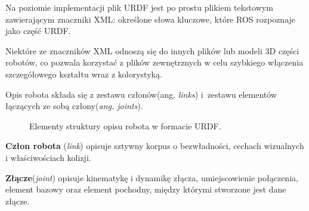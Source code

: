 Na poziomie implementacji plik URDF jest po prostu plikiem tekstowym
zawierającym znaczniki XML: określone słowa kluczowe, które ROS rozpoznaje jako
część URDF.

Niektóre ze znaczników XML odnoszą się do innych plików lub modeli 3D części
robotów, co pozwala korzystać z plików zewnętrznych w celu szybkiego włączenia
szczegółowego kształtu wraz z kolorystyką.

Opis robota składa się z zestawu członów(ang. \textit{links}) i~zestawu
elementów łączących ze sobą człony(\textit{ang. joints}).

\begin{figure}[h]
\centering
{}%
\qquad
{}%
\caption{Elementy struktury opisu robota w formacie URDF.}%
\label{fig:linkjoint}
\end{figure}

\textbf{Człon robota} (\textit{link}) opisuje sztywny korpus o bezwładności,
cechach wizualnych i właściwościach kolizji.

\textbf{Złącze}(\textit{joint}) opisuje kinematykę i dynamikę złącza,
umiejscowienie połączenia, element bazowy oraz element pochodny, między którymi
stworzone jest dane złącze.

